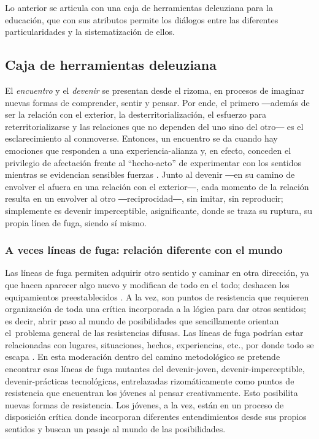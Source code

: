 \documentclass[spanish]{textolivre}
\begin{document}
Lo anterior se articula con una caja de herramientas deleuziana para la educación, que con sus atributos permite los diálogos entre las diferentes particularidades y la sistematización de ellos.

\subsection{Caja de herramientas deleuziana}\label{sec-caja}
El \textit{encuentro} y el \textit{devenir} se presentan desde el rizoma, en procesos de imaginar nuevas formas de comprender, sentir y pensar. Por ende, el primero ―además de ser la relación con el exterior, la desterritorialización, el esfuerzo para reterritorializarse y las relaciones que no dependen del uno sino del otro― es el esclarecimiento al conmoverse. Entonces, un encuentro se da cuando hay emociones que responden a una experiencia-alianza y, en efecto, conceden el privilegio de afectación frente al “hecho-acto” de experimentar con los sentidos mientras se evidencian sensibles fuerzas \cite{deleuze_dialogos._2004}. Junto al devenir ―en su camino de envolver el afuera en una relación con el exterior―, cada momento de la relación resulta en un envolver al otro ―reciprocidad―, sin imitar, sin reproducir; simplemente es devenir imperceptible, asignificante, donde se traza su ruptura, su propia línea de fuga, siendo sí mismo. 

\subsubsection{A veces líneas de fuga: relación diferente con el mundo}\label{sec-veces}
Las líneas de fuga permiten adquirir otro sentido y caminar en otra dirección, ya que hacen aparecer algo nuevo y modifican de todo en el todo; deshacen los equipamientos preestablecidos \cite{guattari_lineas_2013}. A la vez, son puntos de resistencia que requieren organización de toda una crítica incorporada a la lógica para dar otros sentidos; es decir, abrir paso al mundo de posibilidades que sencillamente orientan el problema general de las resistencias difusas. Las líneas de fuga podrían estar relacionadas con lugares, situaciones, hechos, experiencias, etc., por donde todo se escapa \cite{deleuze_que_2007}. En esta moderación dentro del camino metodológico se pretende encontrar esas líneas de fuga mutantes del devenir-joven, devenir-imperceptible, devenir-prácticas tecnológicas, entrelazadas rizomáticamente como puntos de resistencia que encuentran los jóvenes al pensar creativamente. Esto posibilita nuevas formas de resistencia. Los jóvenes, a la vez, están en un proceso de disposición crítica donde incorporan diferentes entendimientos desde sus propios sentidos y buscan un pasaje al mundo de las posibilidades.
\end{document}
